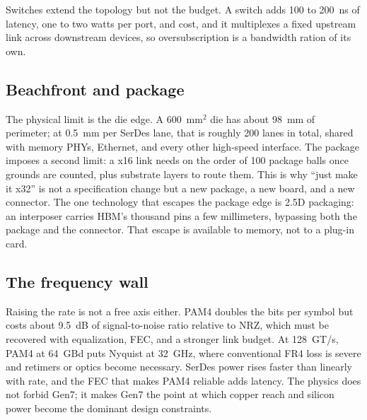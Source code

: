 \documentclass[10pt,letterpaper]{article}
\begin{document}
Switches extend the topology but not the budget. A switch adds 100 to 200~ns of latency, one to two watts per port, and cost, and it multiplexes a fixed upstream link across downstream devices, so oversubscription is a bandwidth ration of its own.

\subsection{Beachfront and package}

The physical limit is the die edge. A 600~mm$^2$ die has about 98~mm of perimeter; at 0.5~mm per SerDes lane, that is roughly 200 lanes in total, shared with memory PHYs, Ethernet, and every other high-speed interface. The package imposes a second limit: a x16 link needs on the order of 100 package balls once grounds are counted, plus substrate layers to route them. This is why ``just make it x32'' is not a specification change but a new package, a new board, and a new connector. The one technology that escapes the package edge is 2.5D packaging: an interposer carries HBM's thousand pins a few millimeters, bypassing both the package and the connector. That escape is available to memory, not to a plug-in card.

\subsection{The frequency wall}

Raising the rate is not a free axis either. PAM4 doubles the bits per symbol but costs about 9.5~dB of signal-to-noise ratio relative to NRZ, which must be recovered with equalization, FEC, and a stronger link budget. At 128~GT/s, PAM4 at 64~GBd puts Nyquist at 32~GHz, where conventional FR4 loss is severe and retimers or optics become necessary. SerDes power rises faster than linearly with rate, and the FEC that makes PAM4 reliable adds latency. The physics does not forbid Gen7; it makes Gen7 the point at which copper reach and silicon power become the dominant design constraints.
\end{document}

